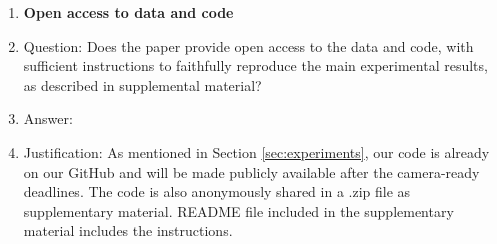 \documentclass{article}
\begin{document}
\begin{enumerate}
\begin{itemize}
        \begin{enumerate}
            \item If the contribution is primarily a new algorithm, the paper should make it clear how to reproduce that algorithm.
            \item If the contribution is primarily a new model architecture, the paper should describe the architecture clearly and fully.
            \item If the contribution is a new model (e.g., a large language model), then there should either be a way to access this model for reproducing the results or a way to reproduce the model (e.g., with an open-source dataset or instructions for how to construct the dataset).
            \item We recognize that reproducibility may be tricky in some cases, in which case authors are welcome to describe the particular way they provide for reproducibility. In the case of closed-source models, it may be that access to the model is limited in some way (e.g., to registered users), but it should be possible for other researchers to have some path to reproducing or verifying the results.
        \end{enumerate}
    \end{itemize}


\item {\bf Open access to data and code}
    \item[] Question: Does the paper provide open access to the data and code, with sufficient instructions to faithfully reproduce the main experimental results, as described in supplemental material?
    \item[] Answer: \answerYes{} %
    \item[] Justification: As mentioned in Section \ref{sec:experiments}, our code is already on our GitHub and will be made publicly available after the camera-ready deadlines. The code is also anonymously shared in a .zip file as supplementary material. README file included in the supplementary material includes the instructions.


\end{enumerate}
\end{document}
